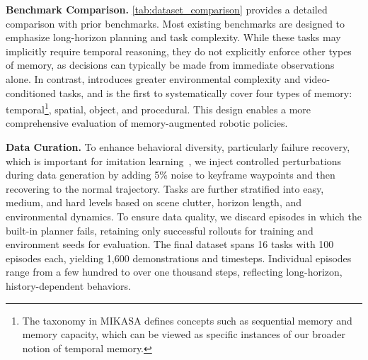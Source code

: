 {\relax
\noindent\textbf{Benchmark Comparison.}
\cref{tab:dataset_comparison} provides a detailed comparison with prior benchmarks. Most existing benchmarks \cite{han2025robocerebra, zhang2025vlabench, mees2022calvin} are designed to emphasize long-horizon planning and task complexity. While these tasks may implicitly require temporal reasoning, they do not explicitly enforce other types of memory, as decisions can typically be made from immediate observations alone.
In contrast, \benchname\xspace introduces greater environmental complexity and video-conditioned tasks, and is the first to systematically cover four types of memory: temporal\footnote{The taxonomy in MIKASA \cite{cherepanov2025memory} defines concepts such as sequential memory and memory capacity, which can be viewed as specific instances of our broader notion of temporal memory.}, spatial, object, and procedural. This design enables a more comprehensive evaluation of memory-augmented robotic policies.
\par}



\noindent\textbf{Data Curation.}
To enhance behavioral diversity, particularly failure recovery, which is important for imitation learning~\cite{dai2025racer}, we inject controlled perturbations during data generation by adding 5\% noise to keyframe waypoints and then recovering to the normal  trajectory. Tasks are further stratified into easy, medium, and hard levels based on scene clutter, horizon length, and environmental dynamics. To ensure data quality, we discard episodes in which the built-in planner fails, retaining only successful rollouts for training and environment seeds for evaluation. The final dataset spans 16 tasks with 100 episodes each, yielding 1,600 demonstrations and \trainsteps\xspace  timesteps. Individual episodes range from a few hundred to over one thousand steps, reflecting long-horizon, history-dependent behaviors.


